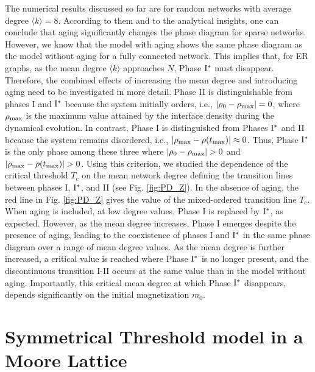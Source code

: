 	The numerical results discussed so far are for random networks with average degree $\langle k \rangle = 8$. According to them and to the analytical insights, one can conclude that aging significantly changes the phase diagram for sparse networks. However, we know that the model with aging shows the same phase diagram as the model without aging for a fully connected network. This implies that, for ER graphs, as the mean degree $\langle k \rangle$ approaches $N$, Phase ${\rm I}^{*}$ must disappear. Therefore, the combined effects of increasing the mean degree and introducing aging need to be investigated in more detail. Phase II is distinguishable from phases I and ${\rm I}^{*}$ because the system initially orders, i.e., $|\rho_0 - \rho_{\rm max}| = 0$, where $\rho_{\rm max}$ is the maximum value attained by the interface density during the dynamical evolution. In contrast, Phase I is distinguished from Phases ${\rm I}^{*}$ and II because the system remains disordered, i.e., $|\rho_{\rm max} - \rho(t_{\rm max})| \approx 0$. Thus, Phase ${\rm I}^{*}$ is the only phase among these three where $|\rho_0 - \rho_{\rm max}| > 0$ and $|\rho_{\rm max} - \rho(t_{\rm max})| > 0$. Using this criterion, we studied the dependence of the critical threshold  $T_c$ on the mean network degree defining the transition lines between phases I, ${\rm I}^{*}$, and II (see Fig. \ref{fig:PD_Z}). In the absence of aging, the red line in Fig. \ref{fig:PD_Z} gives the value of the mixed-ordered transition line $T_c$. When aging is included, at low degree values, Phase I is replaced by ${\rm I}^{*}$, as expected. However, as the mean degree increases, Phase I emerges despite the presence of aging, leading to the coexistence of phases I and ${\rm I}^{*}$ in the same phase diagram over a range of mean degree values. As the mean degree is further increased, a critical value is reached where Phase ${\rm I}^{*}$ is no longer present, and the discontinuous transition I-II occurs at the same value than in the model without aging. Importantly, this critical mean degree at which Phase ${\rm I}^{*}$ disappears, depends significantly on the initial magnetization $m_0$.
	
	\section{\label{sec: Symmetrical Threshold model in a Moore_Lattice}  Symmetrical Threshold model in a Moore Lattice}
	
